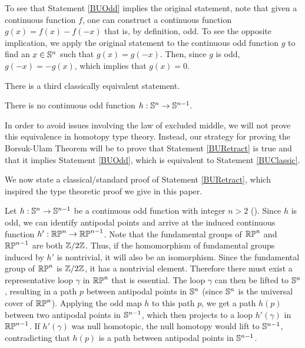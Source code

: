 \documentclass{amsart}
\begin{document}
To see that Statement \ref{BUOdd} implies the original statement, note
that given a continuous function $f$, one can construct a continuous
function $g(x) = f(x) - f(-x)$ that is, by definition, odd. To see the
opposite implication, we apply the original statement to the
continuous odd function $g$ to find an $x \in \mathbb{S}^n$ such that
$g(x)=g(-x)$. Then, since $g$ is odd, $g(-x) = -g(x)$, which implies
that $g(x)=0$.

There is a third classically equivalent statement.

\begin{statement}\label{BURetract}
  There is no continuous odd function $h:\mathbb{S}^n \rightarrow \mathbb{S}^{n-1}$.
\end{statement}

In order to avoid issues involving the law of excluded middle, we will
not prove this equivalence in homotopy type theory. Instead, our
strategy for proving the Borsuk-Ulam Theorem will be to prove that
Statement \ref{BURetract} is true and that it implies Statement
\ref{BUOdd}, which is equivalent to Statement \ref{BUClassic}.

We now state a classical/standard proof of Statement \ref{BURetract},
which inspired the type theoretic proof we give in this paper.



Let $h:\mathbb{S}^n \rightarrow \mathbb{S}^{n-1}$ be a continuous odd function with
integer $n>2$ (). Since $h$ is odd, we
can identify antipodal points and arrive at the induced continuous
function $h':\mathbb{RP}^n\rightarrow\mathbb{RP}^{n-1}$. Note that the fundamental
groups of $\mathbb{RP}^n$ and $\mathbb{RP}^{n-1}$ are both $\mathbb{Z}/2\mathbb{Z}$.  Thus, if the
homomorphism of fundamental groups induced by $h'$ is nontrivial, it
will also be an isomorphism.  Since the fundamental group of $\mathbb{RP}^n$
is $\mathbb{Z}/2\mathbb{Z}$, it has a nontrivial element. Therefore there must exist a
representative loop $\gamma$ in $\mathbb{RP}^n$ that is essential. The loop
$\gamma$ can then be lifted to $\mathbb{S}^n$, resulting in a path $p$
between antipodal points in $\mathbb{S}^n$ (since $\mathbb{S}^n$ is the universal
cover of $\mathbb{RP}^n$). Applying the odd map $h$ to this path $p$, we get
a path $h(p)$ between two antipodal points in $\mathbb{S}^{n-1}$, which then
projects to a loop $h'(\gamma)$ in $\mathbb{RP}^{n-1}$. If $h'(\gamma)$ was
null homotopic, the null homotopy would lift to $\mathbb{S}^{n-1}$,
contradicting that $h(p)$ is a path between antipodal points in
$\mathbb{S}^{n-1}$.
 
\end{document}

